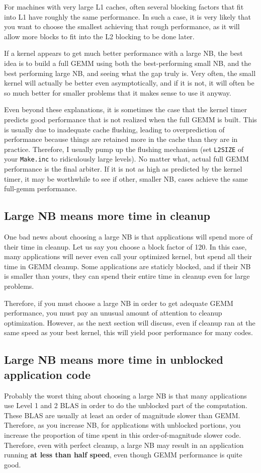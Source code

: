 \documentclass[11pt]{article}
\begin{document}
For machines with very large L1 caches, often several blocking factors that
fit into L1 have roughly the same performance.  In such a case, it is very
likely that you want to choose the smallest achieving that rough
performance, as it will allow more blocks to fit into the L2 blocking
to be done later.

If a kernel appears to get much better performance with a large NB, the
best idea is to build a full GEMM using both the best-performing small
NB, and the best performing large NB, and seeing what the gap truly is.
Very often, the small kernel will actually be better even asymptotically,
and if it is not, it will often be so much better for smaller problems
that it makes sense to use it anyway.

Even beyond these explanations, it is sometimes the case that the kernel
timer predicts good performance that is not realized when the full GEMM
is built.  This is usually due to inadequate cache flushing, leading
to overprediction of performance because things are retained more in
the cache than they are in practice.  Therefore, I usually pump up the
flushing mechanism (set {\tt L2SIZE} of your {\tt Make.inc} to ridiculously
large levels).  No matter what, actual full GEMM performance is the final
arbiter.  If it is not as high as predicted by the kernel timer, it
may be worthwhile to see if other, smaller NB, cases achieve the same
full-gemm performance.

\subsection{Large NB means more time in cleanup}
One bad news about choosing a large NB is that applications will spend
more of their time in cleanup.  Let us say you choose a block factor of
120.  In this case, many applications will never even call your optimized
kernel, but spend all their time in GEMM cleanup.  Some applications are
staticly blocked, and if their NB is smaller than yours, they can spend
their entire time in cleanup even for large problems.

Therefore, if you must choose a large NB in order to get adequate GEMM
performance, you must pay an unusual amount of attention to cleanup
optimization.  However, as the next section will discuss, even if
cleanup ran at the same speed as your best kernel, this will yield
poor performance for many codes.

\subsection{Large NB means more time in unblocked application code}
Probably the worst thing about choosing a large NB is that many applications
use Level 1 and 2 BLAS in order to do the unblocked part of the
computation.  These BLAS are usually at least an order of magnitude slower
than GEMM.  Therefore, as you increase NB, for applications with unblocked
portions, you increase the proportion of time spent in this order-of-magnitude
slower code.  Therefore, even with perfect cleanup, a large NB may result
in an application running {\bf at less than half speed},
even though GEMM performance is quite good.  
\end{document}
